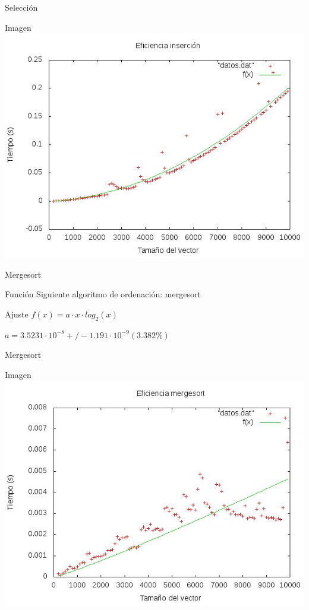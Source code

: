 \documentclass[compress]{beamer}
\begin{document}
\begin{frame}{Selección}
	\begin{alertblock}{Imagen}
	\includegraphics[scale=0.55]{../Graficas/Seleccion/seleccionO0_ruben.jpeg}
	\end{alertblock}
\end{frame}



\begin{frame}{Mergesort}
	\begin{block}{Función}
	Siguiente algoritmo de ordenación: mergesort
	\end{block}
	
	\begin{block}{Ajuste}
	$ f(x) = a\cdot x\cdot log_2(x)$
	
	$ a               = 3.5231\cdot 10^{-8}       +/- 1.191\cdot 10^{-9}    (3.382\%) $
	\end{block}
\end{frame}
\begin{frame}{Mergesort}
	\begin{alertblock}{Imagen}
	\includegraphics[scale=0.55]{../Graficas/Mergesort/mergesortO0_ruben.jpeg}
	\end{alertblock}
\end{frame}
\end{document}

